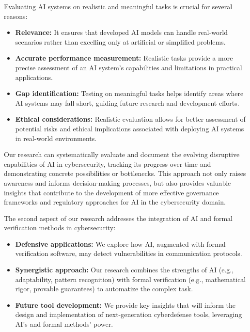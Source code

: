 Evaluating AI systems on realistic and meaningful tasks is crucial for several reasons:
\begin{itemize}
    \item \textbf{Relevance:} It ensures that developed AI models can handle real-world scenarios rather than excelling only at artificial or simplified problems.
    \item \textbf{Accurate performance measurement:} Realistic tasks provide a more precise assessment of an AI system's capabilities and limitations in practical applications.
    \item \textbf{Gap identification:} Testing on meaningful tasks helps identify areas where AI systems may fall short, guiding future research and development efforts.
    \item \textbf{Ethical considerations:} Realistic evaluation allows for better assessment of potential risks and ethical implications associated with deploying AI systems in real-world environments.
\end{itemize}

Our research can systematically evaluate and document the evolving disruptive capabilities of AI in cybersecurity, tracking its progress over time and demonstrating concrete possibilities or bottlenecks. This approach not only raises awareness and informs decision-making processes, but also provides valuable insights that contribute to the development of more effective governance frameworks and regulatory approaches for AI in the cybersecurity domain.

The second aspect of our research addresses the integration of AI and formal verification methods in cybersecurity:
\begin{itemize}
    \item \textbf{Defensive applications:} We explore how AI, augmented with formal verification software, may detect vulnerabilities in communication protocols.
    \item \textbf{Synergistic approach:} Our research combines the strengths of AI (e.g., adaptability, pattern recognition) with formal verification (e.g., mathematical rigor, provable guarantees) to automatize the complex task.
    \item \textbf{Future tool development:} We provide key insights that will inform the design and implementation of next-generation cyberdefense tools, leveraging AI's and formal methods' power.
\end{itemize}